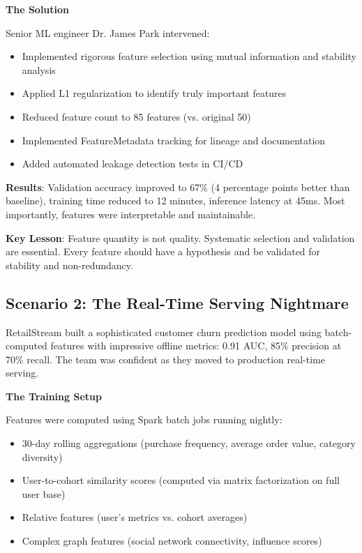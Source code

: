 \textbf{The Solution}

Senior ML engineer Dr. James Park intervened:
\begin{itemize}
    \item Implemented rigorous feature selection using mutual information and stability analysis
    \item Applied L1 regularization to identify truly important features
    \item Reduced feature count to 85 features (vs. original 50)
    \item Implemented FeatureMetadata tracking for lineage and documentation
    \item Added automated leakage detection tests in CI/CD
\end{itemize}

\textbf{Results}: Validation accuracy improved to 67\% (4 percentage points better than baseline), training time reduced to 12 minutes, inference latency at 45ms. Most importantly, features were interpretable and maintainable.

\textbf{Key Lesson}: Feature quantity is not quality. Systematic selection and validation are essential. Every feature should have a hypothesis and be validated for stability and non-redundancy.

\subsection{Scenario 2: The Real-Time Serving Nightmare}

RetailStream built a sophisticated customer churn prediction model using batch-computed features with impressive offline metrics: 0.91 AUC, 85\% precision at 70\% recall. The team was confident as they moved to production real-time serving.

\textbf{The Training Setup}

Features were computed using Spark batch jobs running nightly:
\begin{itemize}
    \item 30-day rolling aggregations (purchase frequency, average order value, category diversity)
    \item User-to-cohort similarity scores (computed via matrix factorization on full user base)
    \item Relative features (user's metrics vs. cohort averages)
    \item Complex graph features (social network connectivity, influence scores)
\end{itemize}

